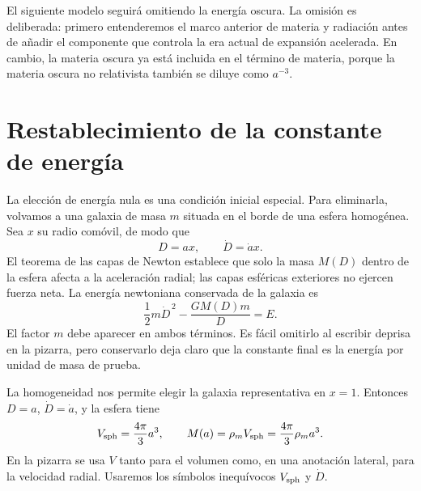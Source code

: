 El siguiente modelo seguirá omitiendo la energía oscura. La omisión es deliberada: primero entenderemos el marco anterior de materia y radiación antes de añadir el componente que controla la era actual de expansión acelerada. En cambio, la materia oscura ya está incluida en el término de materia, porque la materia oscura no relativista también se diluye como \(a^{-3}\).

\begin{classroomqa}
\end{classroomqa}

\section{Restablecimiento de la constante de energía}

La elección de energía nula es una condición inicial especial. Para eliminarla, volvamos a una galaxia de masa \(m\) situada en el borde de una esfera homogénea. Sea \(x\) su radio comóvil, de modo que
\begin{equation}
D=ax,
\qquad
\dot D=\dot a x.
\label{eq:c02-comoving-particle}
\end{equation}
El teorema de las capas de Newton establece que solo la masa \(M(D)\) dentro de la esfera afecta a la aceleración radial; las capas esféricas exteriores no ejercen fuerza neta. La energía newtoniana conservada de la galaxia es
\begin{equation}
\frac{1}{2}m\dot D^{\,2}-\frac{GM(D)m}{D}=E.
\label{eq:c02-newton-energy}
\end{equation}
El factor \(m\) debe aparecer en ambos términos. Es fácil omitirlo al escribir deprisa en la pizarra, pero conservarlo deja claro que la constante final es la energía por unidad de masa de prueba.

La homogeneidad nos permite elegir la galaxia representativa en \(x=1\). Entonces \(D=a\), \(\dot D=\dot a\), y la esfera tiene
\begin{equation}
V_{\rm sph}=\frac{4\pi}{3}a^3,
\qquad
M(a)=\rho_m V_{\rm sph}=\frac{4\pi}{3}\rho_m a^3.
\label{eq:c02-enclosed-mass}
\end{equation}
En la pizarra se usa \(V\) tanto para el volumen como, en una anotación lateral, para la velocidad radial. Usaremos los símbolos inequívocos \(V_{\rm sph}\) y \(\dot D\).

